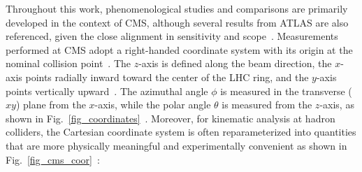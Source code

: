 Throughout this work, phenomenological studies and comparisons are primarily developed in the context of CMS, although several results from ATLAS are also referenced, given the close alignment in sensitivity and scope~\cite{CMS:2008xjf,ATLAS:2008xda}. Measurements performed at CMS adopt a right-handed coordinate system with its origin at the nominal collision point~\cite{CMS:2008xjf}. The $z$-axis is defined along the beam direction, the $x$-axis points radially inward toward the center of the LHC ring, and the $y$-axis points vertically upward~\cite{CMS:2008xjf}. The azimuthal angle $\phi$ is measured in the transverse ($xy$) plane from the $x$-axis, while the polar angle $\theta$ is measured from the $z$-axis, as shown in Fig.~\ref{fig_coordinates}~\cite{CMS:2008xjf}. Moreover, for kinematic analysis at hadron colliders, the Cartesian coordinate system is often reparameterized into quantities that are more physically meaningful and experimentally convenient as shown in Fig.~\ref{fig_cms_coor}~\cite{CMS:PF2017}:

\begin{center}
  
  \label{fig_cms_coor}
\end{center}

